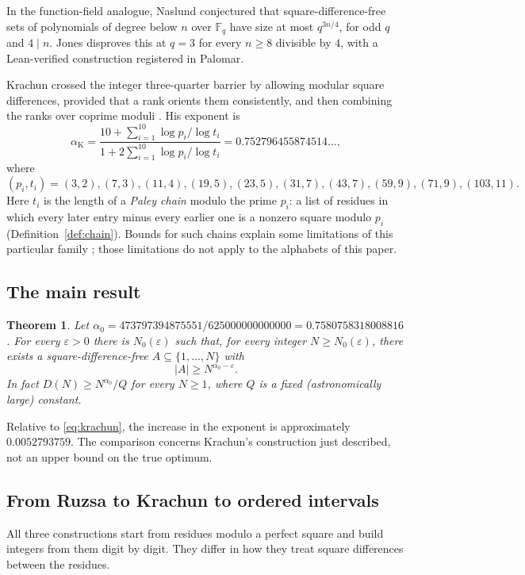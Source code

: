 \documentclass[11pt]{article}
\newtheorem{theorem}{Theorem}[section]
\theoremstyle{definition}
\theoremstyle{remark}
\newcommand{\al}{\alpha_0}
\newcommand{\card}[1]{\lvert #1\rvert}
\begin{document}
In the function-field analogue, Naslund \cite[Conjecture~13]{Naslund2022}
conjectured that square-difference-free sets of polynomials of degree below
$n$ over $\mathbb F_q$ have size at most $q^{3n/4}$, for odd $q$ and $4\mid n$.
Jones \cite{JonesPalomar2026} disproves this at $q=3$ for every $n\ge8$
divisible by $4$, with a Lean-verified construction registered in Palomar.

Krachun crossed the integer three-quarter barrier by allowing modular square
differences, provided that a rank orients them consistently, and then
combining the ranks over coprime moduli \cite{Krachun2026}. His exponent is
\begin{equation}\label{eq:krachun}
 \alpha_{\mathrm K}=
 \frac{10+\sum_{i=1}^{10}\log p_i/\log t_i}
      {1+2\sum_{i=1}^{10}\log p_i/\log t_i}
 =0.752796455874514\ldots,
\end{equation}
where
\[
 (p_i,t_i)=(3,2),(7,3),(11,4),(19,5),(23,5),
 (31,7),(43,7),(59,9),(71,9),(103,11).
\]
Here $t_i$ is the length of a \emph{Paley chain} modulo the prime $p_i$: a
list of residues in which every later entry minus every earlier one is a
nonzero square modulo $p_i$ (Definition~\ref{def:chain}). Bounds for such
chains explain some limitations of this particular family
\cite{Satake2021,Krachun2026}; those limitations do not apply to the alphabets
of this paper.

\subsection{The main result}
\begin{theorem}\label{thm:main}
Let $\al=473797394875551/625000000000000=0.7580758318008816$. For every
$\varepsilon>0$ there is $N_0(\varepsilon)$ such that, for every integer
$N\ge N_0(\varepsilon)$, there exists a square-difference-free
$A\subseteq\{1,\ldots,N\}$ with
\[
 \card A\ge N^{\al-\varepsilon}.
\]
In fact $D(N)\ge N^{\al}/Q$ for every $N\ge1$, where $Q$ is a fixed
(astronomically large) constant.
\end{theorem}

Relative to \eqref{eq:krachun}, the increase in the exponent is approximately
$0.0052793759$. The comparison concerns Krachun's construction just
described, not an upper bound on the true optimum.

\subsection{From Ruzsa to Krachun to ordered intervals}\label{subsec:overview}
All three constructions start from residues modulo a perfect square and build
integers from them digit by digit. They differ in how they treat square
differences between the residues.
\end{document}
